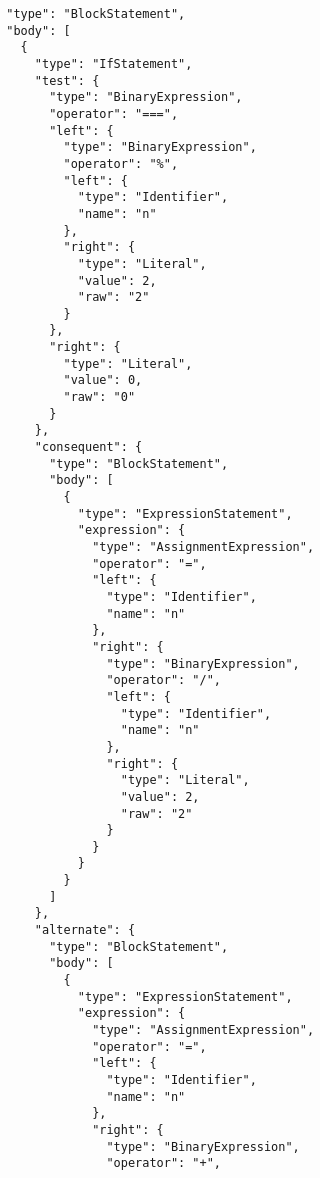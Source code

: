 \begin{verbatim}
              "type": "BlockStatement",
              "body": [
                {
                  "type": "IfStatement",
                  "test": {
                    "type": "BinaryExpression",
                    "operator": "===",
                    "left": {
                      "type": "BinaryExpression",
                      "operator": "%",
                      "left": {
                        "type": "Identifier",
                        "name": "n"
                      },
                      "right": {
                        "type": "Literal",
                        "value": 2,
                        "raw": "2"
                      }
                    },
                    "right": {
                      "type": "Literal",
                      "value": 0,
                      "raw": "0"
                    }
                  },
                  "consequent": {
                    "type": "BlockStatement",
                    "body": [
                      {
                        "type": "ExpressionStatement",
                        "expression": {
                          "type": "AssignmentExpression",
                          "operator": "=",
                          "left": {
                            "type": "Identifier",
                            "name": "n"
                          },
                          "right": {
                            "type": "BinaryExpression",
                            "operator": "/",
                            "left": {
                              "type": "Identifier",
                              "name": "n"
                            },
                            "right": {
                              "type": "Literal",
                              "value": 2,
                              "raw": "2"
                            }
                          }
                        }
                      }
                    ]
                  },
                  "alternate": {
                    "type": "BlockStatement",
                    "body": [
                      {
                        "type": "ExpressionStatement",
                        "expression": {
                          "type": "AssignmentExpression",
                          "operator": "=",
                          "left": {
                            "type": "Identifier",
                            "name": "n"
                          },
                          "right": {
                            "type": "BinaryExpression",
                            "operator": "+",

\end{verbatim}
